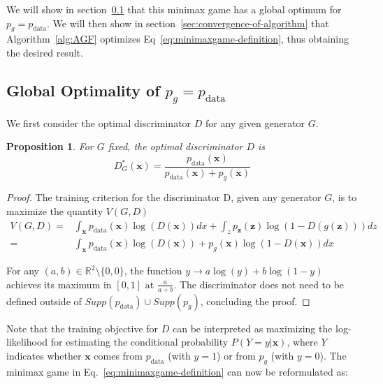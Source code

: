 \documentclass{article} %
\newtheorem{proposition}{Proposition}
\begin{document}

We will show in section~\ref{sec:global-optimality} that this minimax game
has a global optimum for $p_g = p_\text{data}$. We will then show in
section~\ref{sec:convergence-of-algorithm} that Algorithm~\ref{alg:AGF}
optimizes Eq~\ref{eq:minimaxgame-definition}, thus obtaining the desired
result.

\subsection{Global Optimality of $p_g=p_\text{data}$}
\label{sec:global-optimality}

We first consider the optimal discriminator $D$ for any given generator $G$.

\begin{proposition}
For $G$ fixed, the optimal discriminator $D$ is
\begin{equation}
\label{eq:optimal-D}
   D^*_G(\bm{x}) = \frac{p_\text{data}(\bm{x})}{p_\text{data}(\bm{x}) + p_g(\bm{x})}
\end{equation}
\end{proposition}

\begin{proof}
The training criterion for the discriminator D, given any generator $G$, is to maximize the quantity $V(G, D)$
\begin{align}
V(G, D) =& \int_{\bm{x}} p_\text{data}(\bm{x}) \log(D(\bm{x})) dx + \int_z p_{\bm{z}}(\bm{z}) \log(1 - D(g(\bm{z}))) dz \nonumber \\
\label{eq:cost-for-D}
		=& \int_{\bm{x}} p_\text{data}(\bm{x}) \log(D(\bm{x})) + p_g(\bm{x}) \log(1 - D(\bm{x})) dx
\end{align}

For any $(a,b) \in \mathbb{R}^2 \setminus \{0, 0\} $, the function $y \rightarrow a \log (y) + b \log (1-y)$ achieves its maximum in $[0,1]$ at $\frac{a}{a+b}$. The discriminator does not need to be defined outside of $Supp(p_\text{data}) \cup Supp(p_g)$, concluding the proof.
\end{proof}

Note that the training objective for $D$ can be interpreted as maximizing the log-likelihood for estimating the conditional probability $P(Y=y|\bm{x})$, where $Y$ indicates whether $\bm{x}$ comes from $p_\text{data}$ (with $y=1$) or from $p_g$ (with $y=0$). The minimax game in Eq.~\ref{eq:minimaxgame-definition} can now be reformulated as:
\end{document}

